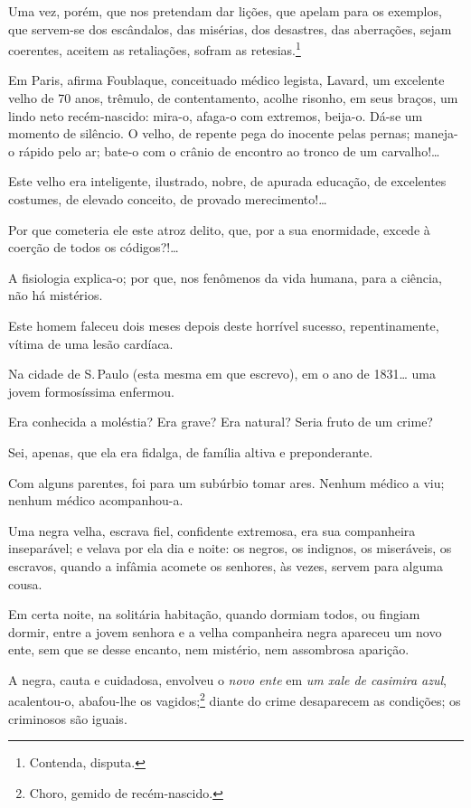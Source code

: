 Uma vez, porém, que nos pretendam dar lições, que apelam para os
exemplos, que servem-se dos escândalos, das misérias, dos desastres, das
aberrações, sejam coerentes, aceitem as retaliações, sofram as
retesias.\footnote{Contenda, disputa.}

\asterisc

Em Paris, afirma Foublaque, conceituado médico legista, Lavard, um
excelente velho de 70 anos, trêmulo, de contentamento, acolhe risonho,
em seus braços, um lindo neto recém-nascido: mira-o, afaga-o com
extremos, beija-o. Dá-se um momento de silêncio. O velho, de repente
pega do inocente pelas pernas; maneja-o rápido pelo ar; bate-o com o
crânio de encontro ao tronco de um carvalho!\ldots{}

Este velho era inteligente, ilustrado, nobre, de apurada educação, de
excelentes costumes, de elevado conceito, de provado merecimento!\ldots{}

Por que cometeria ele este atroz delito, que, por a sua enormidade,
excede à coerção de todos os códigos?!\ldots{}

A fisiologia explica-o; por que, nos fenômenos da vida humana, para a
ciência, não há mistérios.

Este homem faleceu dois meses depois deste horrível sucesso,
repentinamente, vítima de uma lesão cardíaca.

\asterisc

Na cidade de S.\,Paulo (esta mesma em que escrevo), em o ano de
1831\ldots{} uma jovem formosíssima enfermou.

Era conhecida a moléstia? Era grave? Era natural? Seria fruto de um
crime?

Sei, apenas, que ela era fidalga, de família altiva e preponderante.

Com alguns parentes, foi para um subúrbio tomar ares. Nenhum médico a
viu; nenhum médico acompanhou-a.

Uma negra velha, escrava fiel, confidente extremosa, era sua companheira
inseparável; e velava por ela dia e noite: os negros, os indignos, os
miseráveis, os escravos, quando a infâmia acomete os senhores, às vezes,
servem para alguma cousa.

Em certa noite, na solitária habitação, quando dormiam todos, ou fingiam
dormir, entre a jovem senhora e a velha companheira negra apareceu um
novo ente, sem que se desse encanto, nem mistério, nem assombrosa
aparição.

A negra, cauta e cuidadosa, envolveu o \emph{novo ente} em \emph{um xale
de casimira azul}, acalentou-o, abafou-lhe os vagidos;\footnote{Choro,
  gemido de recém-nascido.} diante do crime desaparecem as condições;
os criminosos são iguais.

